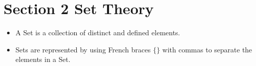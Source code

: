 









\section{Section 2 Set Theory}

\begin{itemize}
\item A Set is a collection of distinct and defined elements. 
\item Sets are represented by using French braces $\{ \}$ with commas to separate the elements in a Set. 
\end{itemize}





